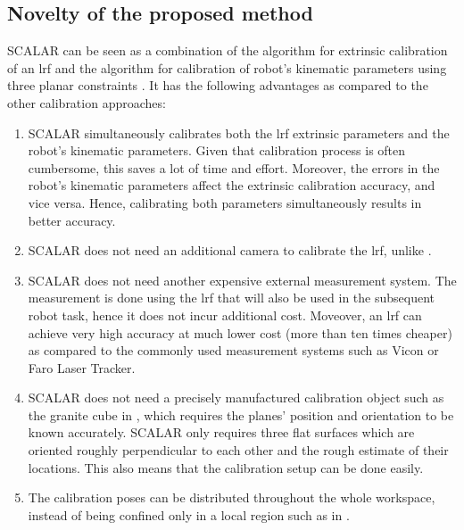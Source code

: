 \subsection{Novelty of the proposed method}
\label{sec:novelty}
SCALAR can be seen as a combination of the algorithm for extrinsic calibration of an \ac{lrf} \cite{Zhang2004} and the algorithm for calibration of robot's kinematic parameters using three planar constraints \cite{Joubair2015}. It has the following advantages as compared to the other calibration approaches:
\begin{enumerate}
\item SCALAR simultaneously calibrates both the \ac{lrf} extrinsic parameters and the robot's kinematic parameters. Given that calibration process is often cumbersome, this saves a lot of time and effort. Moreover, the errors in the robot's kinematic parameters affect the extrinsic calibration accuracy, and vice versa. Hence, calibrating both parameters simultaneously results in better accuracy. 
\item SCALAR does not need an additional camera to calibrate the \ac{lrf}, unlike \cite{Zhang2004}.
\item SCALAR does not need another expensive external measurement system. The measurement is done using the \ac{lrf} that will also be used in the subsequent robot task, hence it does not incur additional cost. Moveover, an \ac{lrf} can achieve very high accuracy at much lower cost (more than ten times cheaper) as compared to the commonly used measurement systems such as Vicon or Faro Laser Tracker. 
\item SCALAR does not need a precisely manufactured calibration object such as the granite cube in \cite{Joubair2015}, which requires the planes' position and orientation to be known accurately. SCALAR only requires
three flat surfaces which are oriented roughly perpendicular to each other and the rough estimate of their locations. This also means that the calibration setup can be done easily.
\item The calibration poses can be distributed throughout the whole workspace, instead of being confined only in a local region such as in \cite{Joubair2015}. 
\end{enumerate}



